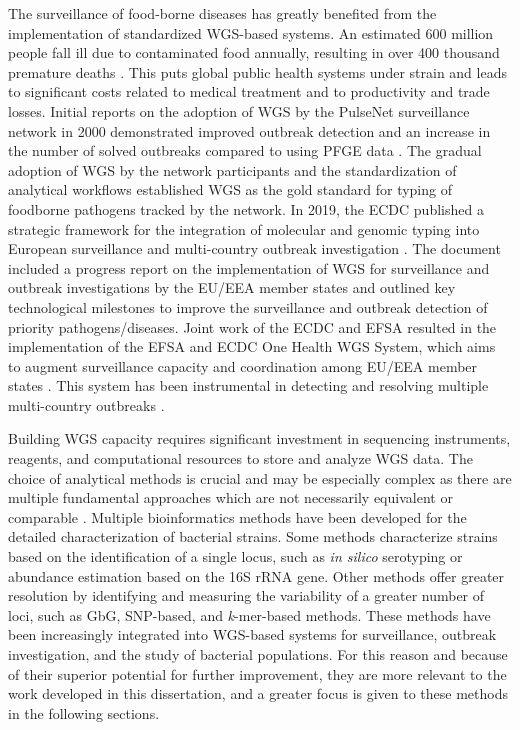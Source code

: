 The surveillance of food-borne diseases has greatly benefited from the implementation of standardized \ac{WGS}-based systems. An estimated 600 million people fall ill due to contaminated food annually, resulting in over 400 thousand premature deaths \cite{noauthor_who_nodate}. This puts global public health systems under strain and leads to significant costs related to medical treatment and to productivity and trade losses. Initial reports on the adoption of \ac{WGS} by the PulseNet surveillance network in 2000 demonstrated improved outbreak detection and an increase in the number of solved outbreaks compared to using \ac{PFGE} data \cite{besser_next-generation_2018, jackson_implementation_2016, ribot_pulsenet_2019}. The gradual adoption of \ac{WGS} by the network participants and the standardization of analytical workflows established \ac{WGS} as the gold standard for typing of foodborne pathogens tracked by the network. In 2019, the \ac{ECDC} published a strategic framework for the integration of molecular and genomic typing into European surveillance and multi-country outbreak investigation \cite{european_centre_for_disease_prevention_and_control_ecdc_2019}. The document included a progress report on the implementation of \ac{WGS} for surveillance and outbreak investigations by the \ac{EU/EEA} member states and outlined key technological milestones to improve the surveillance and outbreak detection of priority pathogens/diseases. Joint work of the \ac{ECDC} and \ac{EFSA} resulted in the implementation of the \ac{EFSA} and \ac{ECDC} One Health \ac{WGS} System, which aims to augment surveillance capacity and coordination among \ac{EU/EEA} member states \cite{authority_efsa_guidelines_2022}. This system has been instrumental in detecting and resolving multiple multi-country outbreaks \cite{noauthor_prolonged_2024, authority_prolonged_2024, european_centre_for_disease_prevention_and_control_european_food_safety_authority_multi-country_2023, european_centre_for_disease_prevention_and_control_european_food_safety_authority_multi-country_2022}.

Building \ac{WGS} capacity requires significant investment in sequencing instruments, reagents, and computational resources to store and analyze \ac{WGS} data. The choice of analytical methods is crucial and may be especially complex as there are multiple fundamental approaches which are not necessarily equivalent or comparable \cite{mixao_multi-country_2025}. Multiple bioinformatics methods have been developed for the detailed characterization of bacterial strains. Some methods characterize strains based on the identification of a single locus, such as \textit{in silico} serotyping or abundance estimation based on the 16S \ac{rRNA} gene. Other methods offer greater resolution by identifying and measuring the variability of a greater number of loci, such as \ac{GbG}, \ac{SNP}-based, and \textit{k}-mer-based methods. These methods have been increasingly integrated into \ac{WGS}-based systems for surveillance, outbreak investigation, and the study of bacterial populations. For this reason and because of their superior potential for further improvement, they are more relevant to the work developed in this dissertation, and a greater focus is given to these methods in the following sections.

